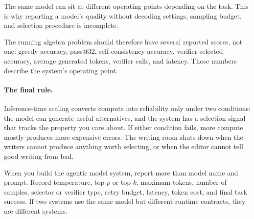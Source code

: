 The same model can sit at different operating points depending on the task. This is why reporting a model's quality without decoding settings, sampling budget, and selection procedure is incomplete.

The running algebra problem should therefore have several reported scores, not one: greedy accuracy, pass@32, self-consistency accuracy, verifier-selected accuracy, average generated tokens, verifier calls, and latency. Those numbers describe the system's operating point.

\noindent{}

\paragraph{The final rule.} Inference-time scaling converts compute into reliability only under two conditions: the model can generate useful alternatives, and the system has a selection signal that tracks the property you care about. If either condition fails, more compute mostly produces more expensive errors. The writing room shuts down when the writers cannot produce anything worth selecting, or when the editor cannot tell good writing from bad.

\begin{tcolorbox}[colback=orange!5, colframe=orange!60, title=\textbf{For Project~4: Report the Runtime Contract}]
When you build the agentic model system, report more than model name and prompt. Record temperature, top-$p$ or top-$k$, maximum tokens, number of samples, selector or verifier type, retry budget, latency, token cost, and final task success. If two systems use the same model but different runtime contracts, they are different systems.
\end{tcolorbox}



